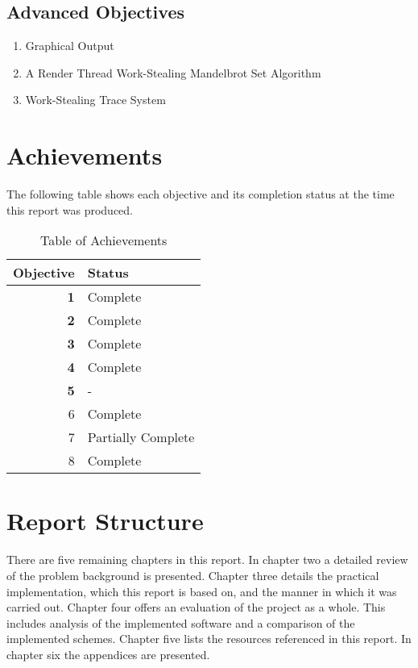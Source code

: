 \subsection*{Advanced Objectives}
\begin{enumerate}
\setcounter{enumi}{\value{saveenum}}
\item Graphical Output
\item A Render Thread Work-Stealing Mandelbrot Set Algorithm
\item Work-Stealing Trace System
\end{enumerate}

\section*{Achievements}
The following table shows each objective and its completion status at the time this
report was produced. 

\begin{table}[H]
    \centering
    \begin{tabular}{|r|l|}
        \hline
            \textbf{Objective} & \textbf{Status} \\
        \hline \hline
            \textbf{1} & Complete \\
            \textbf{2} & Complete \\
            \textbf{3} & Complete \\
            \textbf{4} & Complete \\
            \textbf{5} & - \\
        \hline
            6 & Complete \\
            7 & Partially Complete \\
            8 & Complete \\
        \hline
    \end{tabular}
    
    \label{tab:ach}
    \caption{Table of Achievements}
\end{table}

\section*{Report Structure}

There are five remaining chapters in this report. 
In chapter two a detailed review of the problem background is presented. 
Chapter three details the practical implementation, which this report is based on, and the manner in which it was carried out.
Chapter four offers an evaluation of the project as a whole. This includes analysis of the implemented software and a comparison of the implemented
schemes.
Chapter five lists the resources referenced in this report.
In chapter six the appendices are presented.

